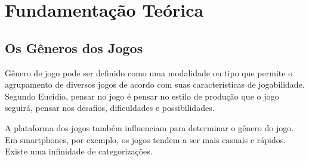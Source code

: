 \chapter{Fundamentação Teórica}
\label{cap:fundamentacao-teorica}


\section{Os Gêneros dos Jogos}
\label{sec:os-generos-dos-jogos}

Gênero de jogo pode ser definido como uma modalidade ou tipo que permite o agrupamento de diversos jogos de acordo com suas características de jogabilidade.
Segundo Eucidio, pensar no jogo é pensar no estilo de produção que o jogo seguirá, pensar nos desafios, dificuldades e possibilidades. \cite{euc}

A plataforma dos jogos também influenciam para determinar o gênero do jogo. Em smartphones, por exemplo, os jogos tendem a ser mais casuais e rápidos. Existe uma infinidade de categorizações. \cite{gen}

